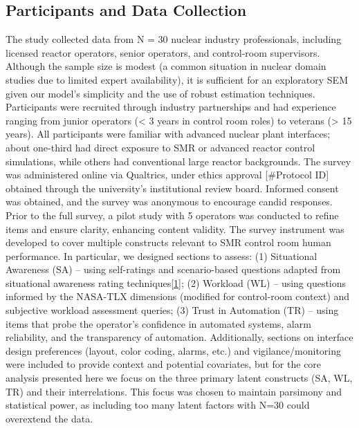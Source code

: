 \documentclass[conference]{IEEEtran}
\begin{document}
\subsection{Participants and Data Collection}
The study collected data from N = 30 nuclear industry professionals, including licensed reactor operators, senior operators, and control-room supervisors. Although the sample size is modest (a common situation in nuclear domain studies due to limited expert availability), it is sufficient for an exploratory SEM given our model’s simplicity and the use of robust estimation techniques. Participants were recruited through industry partnerships and had experience ranging from junior operators (< 3 years in control room roles) to veterans (> 15 years). All participants were familiar with advanced nuclear plant interfaces; about one-third had direct exposure to SMR or advanced reactor control simulations, while others had conventional large reactor backgrounds. The survey was administered online via Qualtrics, under ethics approval [#Protocol ID] obtained through the university’s institutional review board. Informed consent was obtained, and the survey was anonymous to encourage candid responses. Prior to the full survey, a pilot study with 5 operators was conducted to refine items and ensure clarity, enhancing content validity. The survey instrument was developed to cover multiple constructs relevant to SMR control room human performance. In particular, we designed sections to assess: (1) Situational Awareness (SA) – using self-ratings and scenario-based questions adapted from situational awareness rating techniques\href{https://www.researchgate.net/publication/337420277_Designing_for_Situation_Awareness_in_the_Main_Control_Room_of_a_Small_Modular_Reactor}{[1]}; (2) Workload (WL) – using questions informed by the NASA-TLX dimensions (modified for control-room context) and subjective workload assessment queries; (3) Trust in Automation (TR) – using items that probe the operator’s confidence in automated systems, alarm reliability, and the transparency of automation. Additionally, sections on interface design preferences (layout, color coding, alarms, etc.) and vigilance/monitoring were included to provide context and potential covariates, but for the core analysis presented here we focus on the three primary latent constructs (SA, WL, TR) and their interrelations. This focus was chosen to maintain parsimony and statistical power, as including too many latent factors with N=30 could overextend the data.
\end{document}
